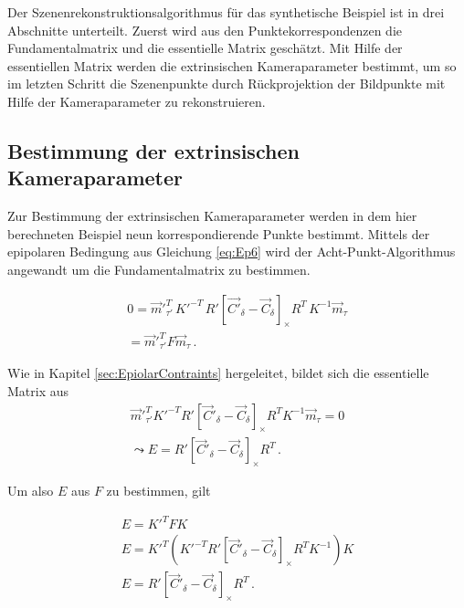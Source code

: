 Der Szenenrekonstruktionsalgorithmus für das synthetische Beispiel ist in drei Abschnitte unterteilt. Zuerst wird aus den Punktekorrespondenzen die Fundamentalmatrix und die essentielle Matrix geschätzt. Mit Hilfe der essentiellen Matrix werden die extrinsischen Kameraparameter bestimmt, um so im letzten Schritt die Szenenpunkte durch Rückprojektion der Bildpunkte mit Hilfe der Kameraparameter zu rekonstruieren. 

\subsection{Bestimmung der extrinsischen Kameraparameter}

Zur Bestimmung der extrinsischen Kameraparameter werden in dem hier berechneten Beispiel neun korrespondierende Punkte bestimmt. Mittels der epipolaren Bedingung aus Gleichung \ref{eq:Ep6} wird der Acht-Punkt-Algorithmus angewandt um die Fundamentalmatrix zu bestimmen.

\begin{gather}
	0=\overrightarrow{m}'^T_{\tau'} \, K'^{-T} \,R' \left[ \overrightarrow{C'}_\delta-\overrightarrow{C}_\delta \right]_\times R^T \, K^{-1}\overrightarrow{m}_\tau\\
	=\overrightarrow{m}'^T_{\tau'} F \overrightarrow{m}_\tau \, .
\end{gather}


Wie in Kapitel \ref{sec:EpiolarContraints} hergeleitet, bildet sich die essentielle Matrix aus
\begin{gather}
	\overrightarrow{m}'^T_{\tau'}K'^{-T}R' \left[ \overrightarrow{C}'_\delta-\overrightarrow{C}_\delta\right]_\times R^TK^{-1}\overrightarrow{m}_\tau=0\\
	\leadsto E = R' \left[ \overrightarrow{C}'_\delta-\overrightarrow{C}_\delta\right]_\times R^T	\, .	
\end{gather}

Um also $E$ aus $F$ zu bestimmen, gilt


\begin{gather}
	 E= K'^T F K\\
    E= K'^T (K'^{-T}R' \left[ \overrightarrow{C}'_\delta-\overrightarrow{C}_\delta\right]_\times R^TK^{-1}) K\\
	E = R' \left[ \overrightarrow{C}'_\delta-\overrightarrow{C}_\delta\right]_\times R^T	\, .
\end{gather}

